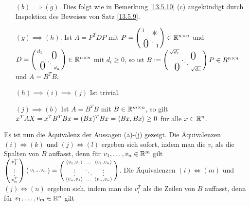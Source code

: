 \documentclass[../../main.tex]{subfiles}
\begin{document}
\begin{cproof}
\begin{itemize}
        \item[$(b)\implies(g)$.] Dies folgt wie in Bemerkung \ref{13.5.10} (c) angekündigt durch Inspektion des Beweises von Satz \ref{13.5.9}.
        \item[$(g)\implies (h)$.]  
            Ist $A=P^TDP$ mit $P=\left(
                \begin{smallmatrix}
                    1 & & \llap{$\overset{\blap{\LARGE *}}{~}$} \\
                    & \ddots &\\
                    \rlap{\tlap{\LARGE 0}} & & 1
                \end{smallmatrix}
            \right)\in \R^{n\times n}$ und $D=\left(
                \begin{smallmatrix}
                    d_1 & & \llap{$\overset{\blap{\LARGE 0}}{~}$} \\
                    & \ddots &\\
                    \rlap{\tlap{\LARGE 0}} & & d_n
                \end{smallmatrix}
            \right)\in \R^{n\times n}$ mit $d_i\ge 0$, so ist $B:=\left(
                \begin{smallmatrix}
                    \sqrt{d_1} & & \llap{$\overset{\blap{\LARGE 0}}{~}$} \\
                    & \ddots &\\
                    \rlap{\tlap{\LARGE 0}} & & \sqrt{d_n}
                \end{smallmatrix}
            \right)P\in R^{n\times n}$ und $A=B^TB$.
        \item[$(h)\implies (i)\implies (j)$] Ist trivial.
        \item[$(j)\implies (b)$] Ist $A=B^TB$ mit $B\in \mathbb R^{m\times n}$, so gilt $x^TAX=x^TB^TBx=(Bx)^TBx=\langle Bx,Bx\rangle\ge 0$ für alle $x\in \mathbb R^n$.
    \end{itemize}
    \noindent Es ist nun die Äquivalenz der Aussagen (a)-(j) gezeigt. Die Äquivalenzen \underline{$(i)\Longleftrightarrow (k)$} und \underline{$(j)\Longleftrightarrow (l)$} ergeben sich sofort, indem man die $v_i$ als die Spalten von $B$ auffasst, denn für $v_1,\ldots ,v_n\in \mathbb R^m$ gilt $\left(\begin{smallmatrix}v_1^T\\\vdots\\ v_n^T\end{smallmatrix}\right)\left(\begin{smallmatrix}v_1\hdots v_n\end{smallmatrix}\right)=\left(\begin{smallmatrix}\langle v_1,v_1\rangle&\hdots&\langle v_1,v_n\rangle\\\vdots &\ddots&\vdots\\ \langle v_n,v_1\rangle&\hdots&\langle v_n,v_n\rangle\end{smallmatrix}\right)$. Die Äquivalenzen \underline{$(i)\Longleftrightarrow (m)$} und \underline{$(j)\Longleftrightarrow (n)$} ergeben sich, indem man die $v^T_i$ als die Zeilen von $B$ auffasst, denn für $v_1,\ldots ,v_m\in \mathbb R^n$ gilt

\end{cproof}
\end{document}
